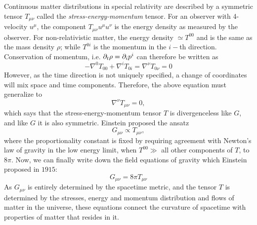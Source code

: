 Continuous matter distributions in special relativity are described by a 
symmetric tensor $T_{\mu\nu}$ called the {\it stress-energy-momentum} tensor.
For an observer with 4-velocity $u^\mu$, the component $T_{\mu\nu}u^\mu u^\nu$
is the energy density as measured by the observer. For non-relativistic matter,
the energy density $\simeq T^{00}$ and is the same as the mass density $\rho$;
while $T^{0i}$ is the momentum in the $i-$th direction. Conservation of 
momentum, i.e. $\partial_t \rho = \partial_i p^i$ can therefore be written as
% 
% 
%
%
\begin{equation*}
- \nabla^0 T_{00} + \nabla^i T_{0i} = \nabla^\nu T_{0 \nu} = 0
\end{equation*}
%
However, as the time direction is not uniquely specified, a change of
coordinates will mix space and time components. Therefore, the above
equation must generalize to 
%
\begin{equation*}
\nabla^\nu T_{\mu\nu} = 0,
\end{equation*}
%
which says that the stress-energy-momentum tensor $T$ is divergenceless like
$G$, and like $G$ it is also symmetric. Einstein proposed the ansatz
%
\begin{equation*}
G_{\mu\nu} \propto T_{\mu\nu},
\end{equation*}
%
where the proportionality constant is fixed by requiring agreement with 
Newton's law of gravity in the low energy limit, when $T^{00}\gg$ all other
components of $T$, to $8\pi$. Now, we can finally write down the field 
equations of gravity which Einstein proposed in $1915$:
%
\begin{equation}
\label{eq:einsteins_equation}
G_{\mu\nu} = 8\pi T_{\mu\nu}
\end{equation}
%
As $G_{\mu\nu}$ is entirely determined by the spacetime metric, and 
the tensor $T$ is determined by the stresses, energy and momentum 
distribution and flows of matter in the universe, these equations connect 
the curvature of spacetime with properties of matter that resides in it.


